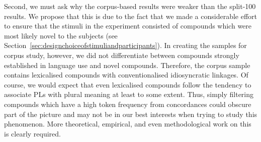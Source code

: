 Second, we must ask why the corpus-based results were weaker than the split-100 results.
We propose that this is due to the fact that we made a considerable effort to ensure that the stimuli in the experiment consisted of compounds which were most likely novel to the subjects (see Section~\ref{sec:designchoiceofstimuliandparticipants}).
In creating the samples for corpus study, however, we did not differentiate between compounds strongly established in language use and novel compounds.
Therefore, the corpus sample contains lexicalised compounds with conventionalised idiosyncratic linkages.
Of course, we would expect that even lexicalised compounds follow the tendency to associate PLs with plural meaning at least to some extent.
Thus, simply filtering compounds which have a high token frequency from concordances could obscure part of the picture and may not be in our best interests when trying to study this phenomenon.
More theoretical, empirical, and even methodological work on this is clearly required.

